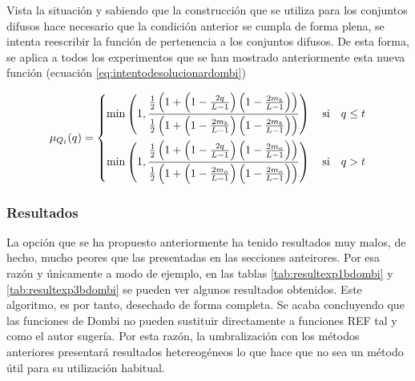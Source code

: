 Vista la situación y sabiendo que la construcción que se utiliza para los conjuntos difusos hace necesario que la condición anterior se cumpla de forma plena, se intenta reescribir la función de pertenencia a los conjuntos difusos. De esta forma, se aplica a todos los experimentos que se han mostrado anteriormente esta nueva función (ecuación \ref{eq:intentodesolucionardombi})

\begin{equation}\label{eq:intentodesolucionardombi}
    \mu_{Q_t}(q)=\left\{ \begin{split}
                 \min\left( 1, \frac
                    {\frac{1}{2} \left(1+\left(1-\frac{2q}{L-1}\right)\left(1-\frac{2m_b}{L-1}\right)\right)}
                    {\frac{1}{2} \left(1+\left(1-\frac{2m_b}{L-1}\right)\left(1-\frac{2m_b}{L-1}\right)\right)}\right)
                 \text{\quad si\quad} q\leq t\\
                 \min\left( 1, \frac
                    {\frac{1}{2} \left(1+\left(1-\frac{2q}{L-1}\right)\left(1-\frac{2m_o}{L-1}\right)\right)}
                    {\frac{1}{2} \left(1+\left(1-\frac{2m_o}{L-1}\right)\left(1-\frac{2m_o}{L-1}\right)\right)}\right)
                \text{\quad si\quad} q > t
                \end{split}\right.
\end{equation}



\subsubsection{Resultados}
La opción que se ha propuesto anteriormente ha tenido resultados muy malos, de hecho, mucho peores que las presentadas en las secciones anteirores. Por esa razón y únicamente a modo de ejemplo, en las tablas \ref{tab:resultexp1bdombi} y \ref{tab:resultexp3bdombi} se pueden ver algunos resultados obtenidos. Este algoritmo, es por tanto, desechado de forma completa. Se acaba concluyendo que las funciones de Dombi no pueden sustituir directamente a funciones REF tal y como el autor sugería. Por esta razón, la umbralización con los métodos anteriores presentará resultados hetereogéneos lo que hace que no sea un método útil para su utilización habitual.

